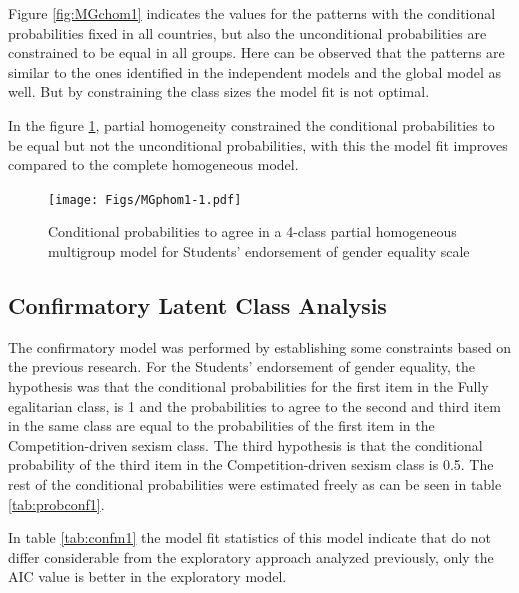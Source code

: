 \documentclass[12pt,a4paper,oneside]{reedthesis}
\begin{document}
Figure \ref{fig:MGchom1} indicates the values for the patterns with the conditional probabilities fixed in all countries, but also the unconditional probabilities are constrained to be equal in all groups. Here can be observed that the patterns are similar to the ones identified in the independent models and the global model as well. But by constraining the class sizes the model fit is not optimal.

In the figure \ref{fig:MGphom1}, partial homogeneity constrained the conditional probabilities to be equal but not the unconditional probabilities, with this the model fit improves compared to the complete homogeneous model.
\begin{figure}
\centering
\texttt{[image: Figs/MGphom1-1.pdf]}
\caption{\label{fig:MGphom1}Conditional probabilities to agree in a 4-class partial homogeneous multigroup model for Students' endorsement of gender equality scale}
\end{figure}
\hypertarget{confirmatory-latent-class-analysis}{%
\subsection{Confirmatory Latent Class Analysis}\label{confirmatory-latent-class-analysis}}

The confirmatory model was performed by establishing some constraints based on the previous research. For the Students' endorsement of gender equality, the hypothesis was that the conditional probabilities for the first item in the Fully egalitarian class, is 1 and the probabilities to agree to the second and third item in the same class are equal to the probabilities of the first item in the Competition-driven sexism class. The third hypothesis is that the conditional probability of the third item in the Competition-driven sexism class is 0.5. The rest of the conditional probabilities were estimated freely as can be seen in table \ref{tab:probconf1}.

In table \ref{tab:confm1} the model fit statistics of this model indicate that do not differ considerable from the exploratory approach analyzed previously, only the AIC value is better in the exploratory model.
\end{document}
